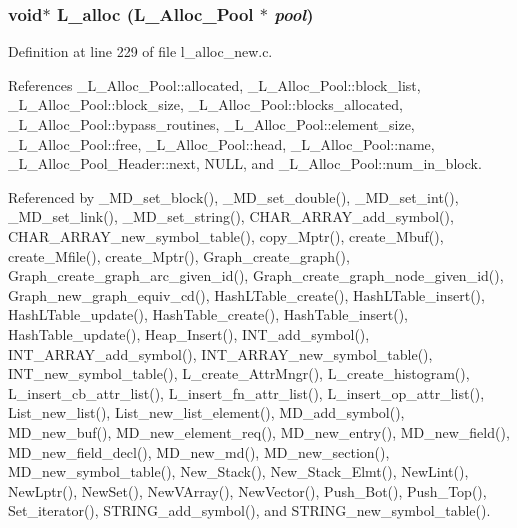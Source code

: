 \subsubsection{\setlength{\rightskip}{0pt plus 5cm}void$\ast$ L\_\-alloc (\bf{L\_\-Alloc\_\-Pool} $\ast$ {\em pool})}\label{l__alloc__new_8c_0d726379da53889d3b6c91cb95afb7e2}




Definition at line 229 of file l\_\-alloc\_\-new.c.

References \_\-L\_\-Alloc\_\-Pool::allocated, \_\-L\_\-Alloc\_\-Pool::block\_\-list, \_\-L\_\-Alloc\_\-Pool::block\_\-size, \_\-L\_\-Alloc\_\-Pool::blocks\_\-allocated, \_\-L\_\-Alloc\_\-Pool::bypass\_\-routines, \_\-L\_\-Alloc\_\-Pool::element\_\-size, \_\-L\_\-Alloc\_\-Pool::free, \_\-L\_\-Alloc\_\-Pool::head, \_\-L\_\-Alloc\_\-Pool::name, \_\-L\_\-Alloc\_\-Pool\_\-Header::next, NULL, and \_\-L\_\-Alloc\_\-Pool::num\_\-in\_\-block.

Referenced by \_\-MD\_\-set\_\-block(), \_\-MD\_\-set\_\-double(), \_\-MD\_\-set\_\-int(), \_\-MD\_\-set\_\-link(), \_\-MD\_\-set\_\-string(), CHAR\_\-ARRAY\_\-add\_\-symbol(), CHAR\_\-ARRAY\_\-new\_\-symbol\_\-table(), copy\_\-Mptr(), create\_\-Mbuf(), create\_\-Mfile(), create\_\-Mptr(), Graph\_\-create\_\-graph(), Graph\_\-create\_\-graph\_\-arc\_\-given\_\-id(), Graph\_\-create\_\-graph\_\-node\_\-given\_\-id(), Graph\_\-new\_\-graph\_\-equiv\_\-cd(), Hash\-LTable\_\-create(), Hash\-LTable\_\-insert(), Hash\-LTable\_\-update(), Hash\-Table\_\-create(), Hash\-Table\_\-insert(), Hash\-Table\_\-update(), Heap\_\-Insert(), INT\_\-add\_\-symbol(), INT\_\-ARRAY\_\-add\_\-symbol(), INT\_\-ARRAY\_\-new\_\-symbol\_\-table(), INT\_\-new\_\-symbol\_\-table(), L\_\-create\_\-Attr\-Mngr(), L\_\-create\_\-histogram(), L\_\-insert\_\-cb\_\-attr\_\-list(), L\_\-insert\_\-fn\_\-attr\_\-list(), L\_\-insert\_\-op\_\-attr\_\-list(), List\_\-new\_\-list(), List\_\-new\_\-list\_\-element(), MD\_\-add\_\-symbol(), MD\_\-new\_\-buf(), MD\_\-new\_\-element\_\-req(), MD\_\-new\_\-entry(), MD\_\-new\_\-field(), MD\_\-new\_\-field\_\-decl(), MD\_\-new\_\-md(), MD\_\-new\_\-section(), MD\_\-new\_\-symbol\_\-table(), New\_\-Stack(), New\_\-Stack\_\-Elmt(), New\-Lint(), New\-Lptr(), New\-Set(), New\-VArray(), New\-Vector(), Push\_\-Bot(), Push\_\-Top(), Set\_\-iterator(), STRING\_\-add\_\-symbol(), and STRING\_\-new\_\-symbol\_\-table().
